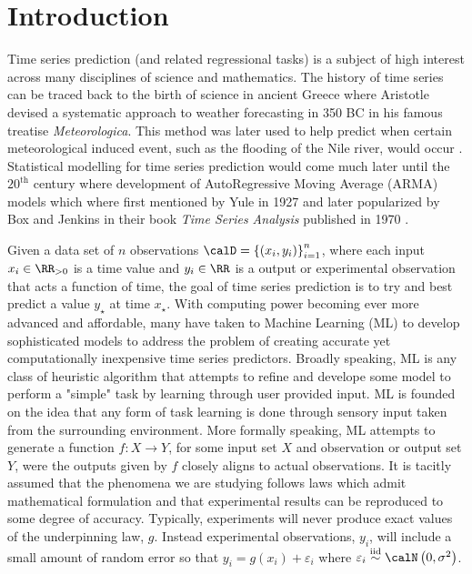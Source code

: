 \section*{Introduction}
Time series prediction (and related regressional tasks) is a subject of high interest across many disciplines of science and mathematics. The history of time series can be traced back to the birth of science in ancient Greece where Aristotle devised a systematic approach to weather forecasting in 350 BC in his famous treatise {\it Meteorologica}. This method was later used to help predict when certain meteorological induced event, such as the flooding of the Nile river, would occur \cite{10.2307/26254645}. Statistical modelling for time series prediction would come much later until the $20^{\text{th}}$ century where development of AutoRegressive Moving Average (ARMA) models which where first mentioned by Yule \cite{YuleG.Udny1927OaMo} in 1927 and later popularized by Box and Jenkins in their book {\it Time Series Analysis} published in 1970 \cite{BoxGeorgeE.P.2008Tsa:}.

Given a data set of $n$ observations $\calD = \left\{ \left( x_i , y_i \right) \right\}_{i=1}^{n}$, where each input $x_i \in \RR_{>0}$ is a time value and $y_i \in \RR$ is a output or experimental observation that acts a function of time, the goal of time series prediction is to try and best predict a value $y_{\star}$ at time $x_{\star}$. With computing power becoming ever more advanced and affordable, many have taken to Machine Learning (ML) to develop sophisticated models to address the problem of creating accurate yet computationally inexpensive time series predictors. Broadly speaking, ML is any class of heuristic algorithm that attempts to refine and develope some model to perform a "simple" task by learning through user provided input. ML is founded on the idea that any form of task learning is done through sensory input taken from the surrounding environment. More formally speaking, ML attempts to generate a function $f : X \to Y$, for some input set $X$ and observation or output set $Y$, were the outputs given by $f$ closely aligns to actual observations. It is tacitly assumed  that the phenomena we are studying follows laws which admit mathematical formulation and that experimental results can be reproduced to some degree of accuracy. Typically, experiments will never produce exact values of the underpinning law, $g$. Instead experimental observations, $y_i$, will include a small amount of random error so that $y_i =  g(x_i) + \varepsilon_i$ where $\varepsilon_i \overset{\text{iid}}{\sim} \calN \left( 0, \sigma^2 \right)$.

